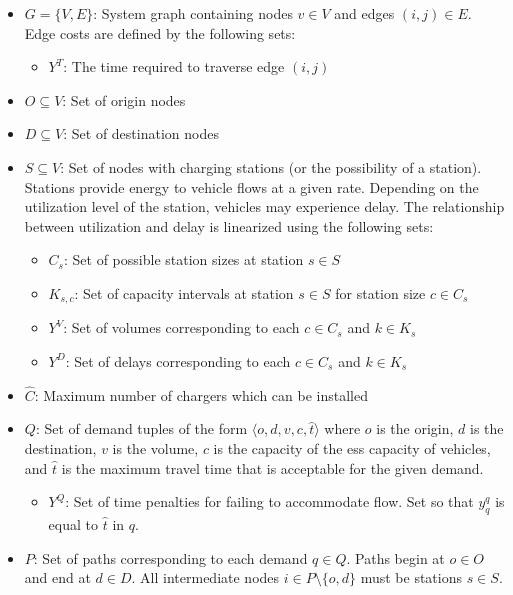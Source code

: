 \documentclass[12pt]{article}
\begin{document}
\begin{itemize}
	\item $G = \{V, E\}$: System graph containing nodes $v \in V$ and edges $(i, j) \in E$. Edge costs are defined by the following sets: \begin{itemize}
		\item $Y^T$: The time required to traverse edge $(i, j)$
	\end{itemize}
	\item $O \subseteq V$: Set of origin nodes
	\item $D \subseteq V$: Set of destination nodes
	\item $S \subseteq V$: Set of nodes with charging stations (or the possibility of a station). Stations provide energy to vehicle flows at a given rate. Depending on the utilization level of the station, vehicles may experience delay. The relationship between utilization and delay is linearized using the following sets: \begin{itemize}
		\item $C_s$: Set of possible station sizes at station $s \in S$
		\item $K_{s, c}$: Set of capacity intervals at station $s \in S$ for station size $c \in C_s$
		\item $Y^V$: Set of volumes corresponding to each $c \in C_s$ and $k \in K_s$
		\item $Y^D$: Set of delays corresponding to each $c \in C_s$ and $k \in K_s$ 
	\end{itemize}
	\item $\hat{C}$: Maximum number of chargers which can be installed
	\item $Q$: Set of demand tuples of the form $\langle o, d, v, c, \hat{t} \rangle$ where $o$ is the origin, $d$ is the destination, $v$ is the volume, $c$ is the capacity of the \gls{ess} capacity of vehicles, and $\hat{t}$ is the maximum travel time that is acceptable for the given demand. \begin{itemize}
		\item $Y^Q$: Set of time penalties for failing to accommodate flow. Set so that $y^q_q$ is equal to $\hat{t}$ in $q$.
	\end{itemize}
	\item $P$: Set of paths corresponding to each demand $q \in Q$. Paths begin at $o \in O$ and end at $d \in D$. All intermediate nodes $i \in P \setminus \{o, d\}$ must be stations $s \in S$.\begin{itemize}

\end{itemize}
\end{itemize}
\end{document}
